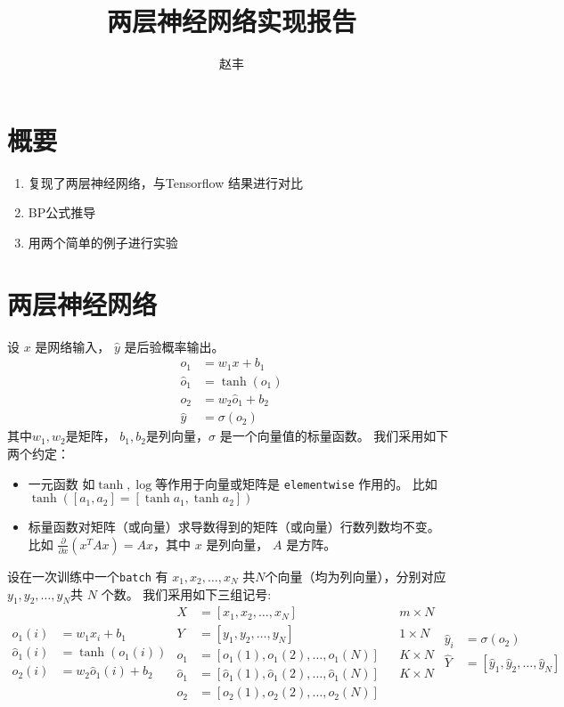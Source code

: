 \documentclass{ctexart}
\title{两层神经网络实现报告}
\author{赵丰}
\begin{document}
\maketitle
\section{概要}
\begin{enumerate}
\item 复现了两层神经网络，与Tensorflow 结果进行对比
\item BP公式推导
\item 用两个简单的例子进行实验
\end{enumerate}
\section{两层神经网络}
设 $x$ 是网络输入， $ \hat{y}$ 是后验概率输出。
    \begin{align*}
   o_1 & = w_1 x + b_1 \\
    \hat{o}_1 & = \tanh(o_1) \\
    o_2 & = w_2 \hat{o}_1 + b_2 \\    
    \hat{y} & = \sigma(o_2)    
    \end{align*}
    其中$w_1, w_2 $是矩阵， $b_1, b_2$是列向量，$\sigma $ 是一个向量值的标量函数。
    我们采用如下两个约定：
    \begin{itemize}
   \item  一元函数 如$\tanh,\log $等作用于向量或矩阵是 \texttt{elementwise} 作用的。
   比如 $\tanh([a_1, a_2] = [\tanh a_1, \tanh a_2])$
   \item 标量函数对矩阵（或向量）求导数得到的矩阵（或向量）行数列数均不变。
   比如 $ \frac{\partial}{\partial x} ( x^T A x )= Ax $，其中 $x$ 是列向量， $A$ 是方阵。
    \end{itemize}
    设在一次训练中一个\texttt{batch} 有 $x_1, x_2, \dots, x_N$ 共$N$个向量（均为列向量），分别对应$y_1, y_2, \dots, y_N$共 $N$
    个数。
    我们采用如下三组记号:
    \begin{subequations}
    \begin{align}
       o_1(i) & = w_1 x_i + b_1 \\
        \hat{o}_1(i) & = \tanh(o_1(i)) \\
        o_2(i) & = w_2 \hat{o}_1(i) + b_2 
    \end{align}
    \begin{align}
        X & = [x_1, x_2, \dots, x_N] && m \times N\\
        Y & = [y_1, y_2, \dots, y_N] && 1 \times N\\            
o_1 & = [o_1(1), o_1(2), \dots, o_1(N)] && K \times N\\
    \hat{o}_1 & = [\hat{o}_1(1), \hat{o}_1(2), \dots, \hat{o}_1(N)] && K \times N\\
 \label{eq:o2}   o_2 & = [o_2(1), o_2(2), \dots, o_2(N)]
    \end{align}
    \begin{align}
        \hat{y}_i & = \sigma(o_2)  \\
        \hat{Y} & = [\hat{y}_1, \hat{y}_2, \dots, \hat{y}_N]
    \end{align}
\end{subequations}
\end{document}
